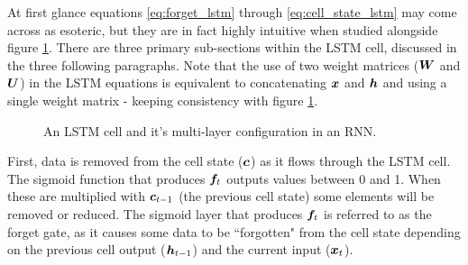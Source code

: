 At first glance equations \ref{eq:forget_lstm} through \ref{eq:cell_state_lstm} may come across as esoteric, but they are in fact highly intuitive when studied alongside figure \ref{fig:LSTM}.
There are three primary sub-sections within the LSTM cell, discussed in the three following paragraphs.
Note that the use of two weight matrices (${\bm{W}}$ and ${\bm{U}}$) in the LSTM equations is equivalent to concatenating ${\bm{x}}$ and ${\bm{h}}$ and using a single weight matrix - keeping consistency with figure \ref{fig:LSTM}.

\begin{figure}[htbp]
	\centering
	\quad\quad
	\caption{An LSTM cell and it's multi-layer configuration in an RNN.}
	\label{fig:LSTM}
\end{figure}

First, data is removed from the cell state (${\bm{c}}$) as it flows through the LSTM cell.
The sigmoid function that produces ${\bm{f}}_t$ outputs values between 0 and 1.
When these are multiplied with ${\bm{c}}_{t-1}$ (the previous cell state) some elements will be removed or reduced.
The sigmoid layer that produces ${\bm{f}}_t$ is referred to as the forget gate, as it causes some data to be ``forgotten" from the cell state depending on the previous cell output (${\bm{h}}_{t-1}$) and the current input (${\bm{x}}_t$).

